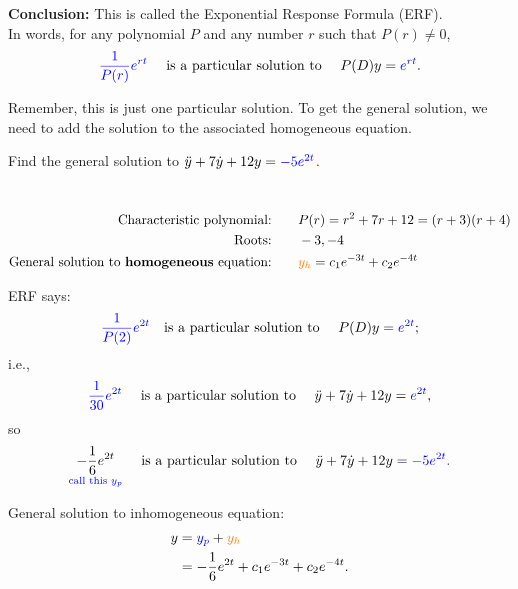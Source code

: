\textbf{\color{orange} Conclusion:} This is called the {\color{blue} Exponential Response Formula (ERF).}\\
In words, for any polynomial $P$ and any number $r$ such that $P(r) \neq 0$,
\begin{equation*}
  {\color{blue}{\frac{1}{P(r)} e^{rt}}}  \quad
  \text { is a particular solution to }
  \quad P(D) y = {\color{blue}{e^{rt}}} .
\end{equation*}

Remember, this is just one particular solution.
To get the general solution, we need to add the solution to the associated homogeneous equation.

\begin{example}
  Find the general solution to $\ddot{y} + 7\dot{y} + 12 y = {\color{blue}{-5e^{2t}}}$. 
\end{example}

\Solution\\
\begin{align*}
  \text{Characteristic polynomial:} \qquad
  &P(r) = r^2+7r+12 = (r+3)(r+4)\\
  \text{Roots:} \qquad
  & -3, -4\\
  \text{General solution to \textbf{homogeneous} equation:} \qquad
  & {\color{orange}{y_ h}}  = c_1 e^{-3t} + c_2 e^{-4t}    
\end{align*}

ERF says:
\begin{equation*}
  {\color{blue}{\frac{1}{P(2)} e^{2t}}}
  \quad \text {is a particular solution to }
  \quad P(D) y = {\color{blue}{e^{2t}}} ;
\end{equation*}
i.e.,
\begin{equation*}
  {\color{blue}{\frac{1}{30} e^{2t}}}
  \quad \text { is a particular solution to }
  \quad \ddot{y} + 7 \dot{y} + 12 y = {\color{blue}{e^{2t}}} ,
\end{equation*}
so
\begin{equation*}
  \underset {{\color{blue}{ \text {call this } y_ p}} }{-\frac{1}{6} e^{2t}}
  \quad \textrm{ is a particular solution to }
  \quad \ddot{y} + 7 \dot{y} + 12 y = {\color{blue}{-5e^{2t}}} .
\end{equation*}

General solution to inhomogeneous equation:
\begin{align*}
  \displaystyle y \displaystyle &= {\color{blue}{y_ p}}  + {\color{orange}{y_ h}} \\
  \displaystyle &= -\frac{1}{6} e^{2t} + c_1 e^{-3t} + c_2 e^{-4t}.
\end{align*}
\clearpage
